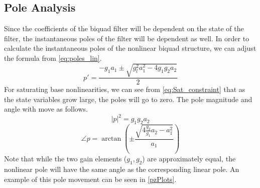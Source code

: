 \documentclass{IEEEtran}
\begin{document}
\subsection{Pole Analysis}
%
Since the coefficients of the biquad filter will be dependent on the
state of the filter, the instantaneous poles of the filter will be
dependent as well. In order to calculate the instantaneous poles of
the nonlinear biquad structure, we can adjust the formula from
\cref{eq:poles_lin}.
%
\begin{equation}
    p' = \frac{-g_1 a_1 \pm \sqrt{g_l^2 a_1^2- 4 g_1 g_2 a_2}}{2}
    \label{eq:poles_nl}
\end{equation}
%
For saturating base nonlinearities, we can see from \cref{eq:Sat_constraint}
that as the state variables grow large, the poles will go to zero.
\newline\newline
The pole magnitude and angle with move as follows.
\begin{equation}
    |p|^2 = g_1g_2a_2
    \label{eq:poles_nl_mag}
\end{equation}
%
\begin{equation}
    \angle p = \arctan \left( \pm \frac{\sqrt{4\frac{g_2}{g_1}a_2 - a_1^2}}{a_1} \right)
    \label{eq:poles_nl_angle}
\end{equation}
%
Note that while the two gain elements ($g_1, g_2$) are approximately
equal, the nonlinear pole will have the same angle as the
corresponding linear pole. An example of this pole movement
can be seen in \cref{pzPlots}.
%
\end{document}
